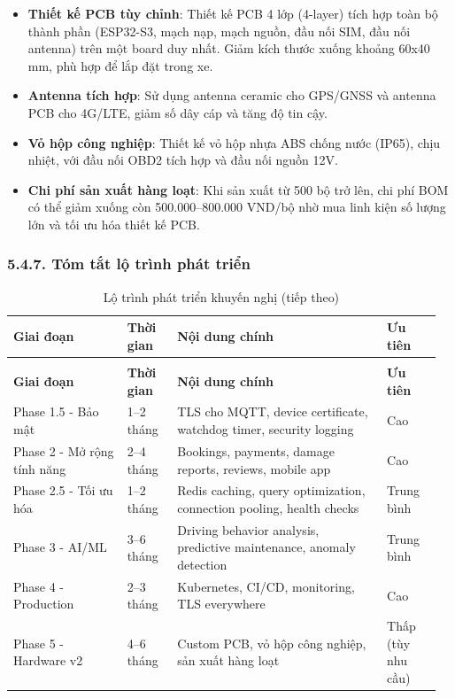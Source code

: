 \documentclass[a4paper]{extarticle}
\newcommand{\thesissettableid}[2]{%
  \renewcommand{\thetable}{#1}%
  \renewcommand{\theHtable}{#2}%
}
\providecommand{\tightlist}{%
  \setlength{\itemsep}{0pt}\setlength{\parskip}{0pt}}
\begin{document}
\begin{itemize}
\tightlist
\item
  \textbf{Thiết kế PCB tùy chỉnh}: Thiết kế PCB 4 lớp (4-layer) tích hợp
  toàn bộ thành phần (ESP32-S3, mạch nạp, mạch nguồn, đầu nối SIM, đầu
  nối antenna) trên một board duy nhất. Giảm kích thước xuống khoảng
  60x40 mm, phù hợp để lắp đặt trong xe.
\item
  \textbf{Antenna tích hợp}: Sử dụng antenna ceramic cho GPS/GNSS và
  antenna PCB cho 4G/LTE, giảm số dây cáp và tăng độ tin cậy.
\item
  \textbf{Vỏ hộp công nghiệp}: Thiết kế vỏ hộp nhựa ABS chống nước
  (IP65), chịu nhiệt, với đầu nối OBD2 tích hợp và đầu nối nguồn 12V.
\item
  \textbf{Chi phí sản xuất hàng loạt}: Khi sản xuất từ 500 bộ trở lên,
  chi phí BOM có thể giảm xuống còn 500.000--800.000 VND/bộ nhờ mua linh
  kiện số lượng lớn và tối ưu hóa thiết kế PCB.
\end{itemize}

\subsubsection{5.4.7. Tóm tắt lộ trình phát
triển}\label{547-tuxf3m-tux1eaft-lux1ed9-truxecnh-phuxe1t-triux1ec3n}


{\thesissettableid{5.10}{tab-ch5-lo-trinh-phat-trien-khuyen-nghi}
\def\LTcaptype{table}
\begin{longtable}{|L{0.251\linewidth}|L{0.115\linewidth}|L{0.460\linewidth}|L{0.129\linewidth}|}
\caption{Lộ trình phát triển khuyến nghị}\label{tab:ch5-lo-trinh-phat-trien-khuyen-nghi}\\
\hline \textbf{Giai đoạn} & \textbf{Thời gian} & \textbf{Nội dung chính} & \textbf{Ưu tiên} \\
\hline
\endfirsthead
\caption[]{Lộ trình phát triển khuyến nghị (tiếp theo)}\\
\hline \textbf{Giai đoạn} & \textbf{Thời gian} & \textbf{Nội dung chính} & \textbf{Ưu tiên} \\
\hline
\endhead
\hline
\endfoot
\endlastfoot
Phase 1.5 - Bảo mật & 1--2 tháng & TLS cho MQTT, device certificate,
watchdog timer, security logging & Cao \\\hline
Phase 2 - Mở rộng tính năng & 2--4 tháng & Bookings, payments, damage
reports, reviews, mobile app & Cao \\\hline
Phase 2.5 - Tối ưu hóa & 1--2 tháng & Redis caching, query optimization,
connection pooling, health checks & Trung bình \\\hline
Phase 3 - AI/ML & 3--6 tháng & Driving behavior analysis, predictive
maintenance, anomaly detection & Trung bình \\\hline
Phase 4 - Production & 2--3 tháng & Kubernetes, CI/CD, monitoring, TLS
everywhere & Cao \\\hline
Phase 5 - Hardware v2 & 4--6 tháng & Custom PCB, vỏ hộp công nghiệp, sản
xuất hàng loạt & Thấp (tùy nhu cầu) \\\hline
\end{longtable}
}
\end{document}
